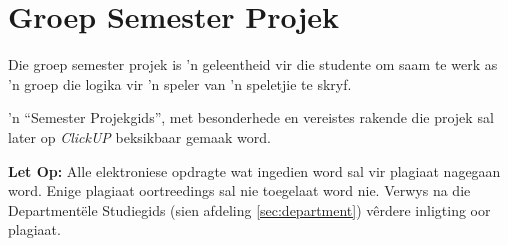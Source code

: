 \section{Groep Semester Projek}
        Die groep semester projek is 'n geleentheid vir die studente om saam te
        werk as 'n groep die logika vir 'n speler van 'n speletjie te skryf.
        
        'n ``Semester Projekgids'', met besonderhede en vereistes rakende die projek
        sal later op \textit{ClickUP} beksikbaar gemaak word.

    \textbf{Let Op:} Alle elektroniese opdragte wat ingedien word sal vir plagiaat
    nagegaan word. Enige plagiaat oortreedings sal nie toegelaat word nie.
    Verwys na die Department\"ele Studiegids (sien afdeling
    \ref{sec:department}) v\^erdere inligting oor plagiaat.

